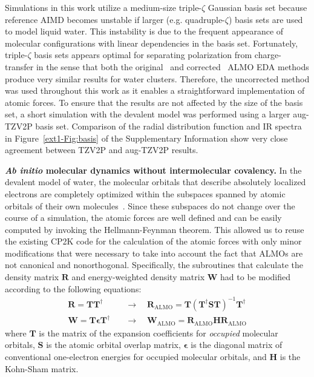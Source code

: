 \documentclass[journal=jacsat,manuscript=article]{achemso}
\begin{document}
Simulations in this work utilize a medium-size triple-$\zeta$ Gaussian basis set because reference AIMD becomes unstable if larger (e.g. quadruple-$\zeta$) basis sets are used to model liquid water. 
This instability is due to the frequent appearance of molecular configurations with linear dependencies in the basis set. 
Fortunately, triple-$\zeta$ basis sets appears optimal for separating polarization from charge-transfer in the sense that both the original~\cite{khaliullin2007unravelling} and corrected~\cite{horn2015polarization} ALMO EDA methods produce very similar results for water clusters. 
Therefore, the uncorrected method was used throughout this work as it enables a straightforward implementation of atomic forces. 
To ensure that the results are not affected by the size of the basis set, a short simulation with the devalent model was performed using a larger aug-TZV2P basis set. Comparison of the radial distribution function and IR spectra in Figure~\ref{ext1-Fig:basis} of the Supplementary Information show very close agreement between TZV2P and aug-TZV2P results. 

\textbf{\textit{Ab initio} molecular dynamics without intermolecular covalency.} In the devalent model of water, the molecular orbitals that describe absolutely localized electrons are completely optimized within the subspaces spanned by atomic orbitals of their own molecules~\cite{khaliullin2006efficient}. Since these subspaces do not change over the course of a simulation, the atomic forces are well defined and can be easily computed by invoking the Hellmann-Feynman theorem. This allowed us to reuse the existing CP2K code for the calculation of the atomic forces with only minor modifications that were necessary to take into account the fact that ALMOs are not canonical and nonorthogonal. Specifically, the subroutines that calculate the density matrix $\mathbf{R}$ and  energy-weighted density matrix $\mathbf{W}$ had to be modified according to the following equations:
%
\begin{equation}
\begin{split}
\mathbf{R} = \mathbf{T} \mathbf{T}^{\dagger} \quad &\rightarrow \quad \mathbf{R}_{\text{ALMO}} = \mathbf{T} (\mathbf{T}^{\dagger} \mathbf{S} \mathbf{T})^{-1}\mathbf{T}^{\dagger} \\
\mathbf{W} = \mathbf{T} \mathbf{\epsilon} \mathbf{T}^{\dagger} \quad &\rightarrow \quad \mathbf{W}_{\text{ALMO}}  = \mathbf{R}_{\text{ALMO}} \mathbf{H} \mathbf{R}_{\text{ALMO}}
\end{split}
\end{equation}
%
where $\mathbf{T}$ is the matrix of the expansion coefficients for \emph{occupied} molecular orbitals, $\mathbf{S}$ is the atomic orbital overlap matrix, $\mathbf{\epsilon}$ is the diagonal matrix of conventional one-electron energies for occupied molecular orbitals, and $\mathbf{H}$ is the Kohn-Sham matrix.
\end{document}

